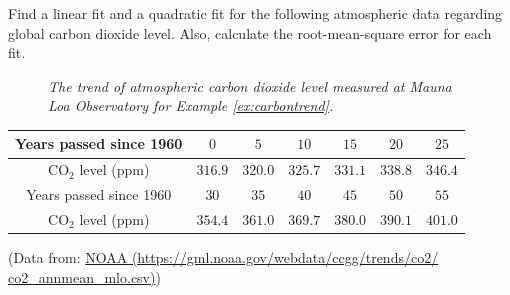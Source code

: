 \begin{Exercise}
\label{ex:carbontrend}
Find a linear fit and a quadratic fit for the following atmospheric data regarding global carbon dioxide level. Also, calculate the root-mean-square error for each fit.
\begin{figure}[h!]
\centering
{}
\caption{\textit{The trend of atmospheric carbon dioxide level measured at Mauna Loa Observatory for Example \ref{ex:carbontrend}.}}
\end{figure}
\begin{center}
\begin{tabular}{|c|c|c|c|c|c|c|}
\hline
Years passed since 1960 & $0$ & $5$ & $10$ & $15$ & $20$ & $25$ \\
\hline
CO$_2$ level (ppm) & $316.9$ & $320.0$ & $325.7$ & $331.1$ & $338.8$ & $346.4$ \\
\hline
Years passed since 1960 & $30$ & $35$ & $40$ & $45$ & $50$ & $55$\\
\hline
CO$_2$ level (ppm) & $354.4$ & $361.0$ & $369.7$ & $380.0$ & $390.1$ & $401.0$\\
\hline
\end{tabular}
\end{center}
(Data from: \href{https://gml.noaa.gov/webdata/ccgg/trends/co2/co2_mm_mlo.csv}{NOAA (https://gml.noaa.gov/webdata/ccgg/trends/co2/\\co2\_annmean\_mlo.csv)})
\end{Exercise}

